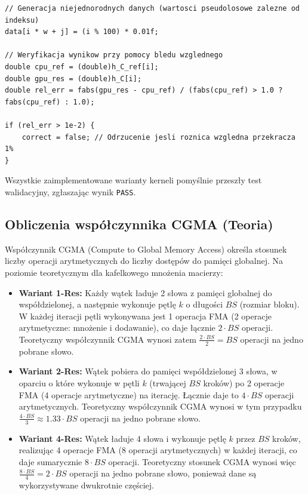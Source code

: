 \documentclass[10pt]{article}
\begin{document}
\begin{lstlisting}[style=mystyle, caption={Logika testu poprawności z uwzględnieniem błędu względnego.}, label={lst:validation}]
// Generacja niejednorodnych danych (wartosci pseudolosowe zalezne od indeksu)
data[i * w + j] = (i % 100) * 0.01f;

// Weryfikacja wynikow przy pomocy bledu wzglednego
double cpu_ref = (double)h_C_ref[i];
double gpu_res = (double)h_C[i];
double rel_err = fabs(gpu_res - cpu_ref) / (fabs(cpu_ref) > 1.0 ? fabs(cpu_ref) : 1.0);

if (rel_err > 1e-2) {
    correct = false; // Odrzucenie jesli roznica wzgledna przekracza 1%
}
\end{lstlisting}

Wszystkie zaimplementowane warianty kerneli pomyślnie przeszły test walidacyjny, zgłaszając wynik \texttt{PASS}.

\subsection*{Obliczenia współczynnika CGMA (Teoria)}
Współczynnik CGMA (Compute to Global Memory Access) określa stosunek liczby operacji arytmetycznych do liczby dostępów do pamięci globalnej. Na poziomie teoretycznym dla kafelkowego mnożenia macierzy:
\begin{itemize}
    \item \textbf{Wariant 1-Res:} Każdy wątek ładuje 2 słowa z pamięci globalnej do współdzielonej, a następnie wykonuje pętlę $k$ o długości $BS$ (rozmiar bloku). W każdej iteracji pętli wykonywana jest 1 operacja FMA (2 operacje arytmetyczne: mnożenie i dodawanie), co daje łącznie $2 \cdot BS$ operacji. Teoretyczny współczynnik CGMA wynosi zatem $\frac{2 \cdot BS}{2} = BS$ operacji na jedno pobrane słowo.
    
    \item \textbf{Wariant 2-Res:} Wątek pobiera do pamięci współdzielonej 3 słowa, w oparciu o które wykonuje w pętli $k$ (trwającej $BS$ kroków) po 2 operacje FMA (4 operacje arytmetyczne) na iterację. Łącznie daje to $4 \cdot BS$ operacji arytmetycznych. Teoretyczny współczynnik CGMA wynosi w tym przypadku $\frac{4 \cdot BS}{3} \approx 1.33 \cdot BS$ operacji na jedno pobrane słowo.
    
    \item \textbf{Wariant 4-Res:} Wątek ładuje 4 słowa i wykonuje pętlę $k$ przez $BS$ kroków, realizując 4 operacje FMA (8 operacji arytmetycznych) w każdej iteracji, co daje sumarycznie $8 \cdot BS$ operacji. Teoretyczny stosunek CGMA wynosi więc $\frac{8 \cdot BS}{4} = 2 \cdot BS$ operacji na jedno pobrane słowo, ponieważ dane są wykorzystywane dwukrotnie częściej.
\end{itemize}
\end{document}

